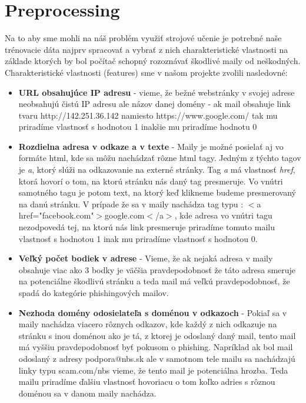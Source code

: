 \documentclass[12pt]{article}
\begin{document}
\section*{Preprocessing}
Na to aby sme mohli na náš problém využiť strojové učenie je potrebné naše trénovacie dáta najprv spracovať a vybrať z nich charakteristické vlastnosti na základe ktorých by bol počítač schopný rozoznávať škodlivé maily od neškodných. Charakteristické vlastnosti (features) sme v našom projekte zvolili nasledovné:
\begin{itemize}
\item \textbf{URL obsahujúce IP adresu} - vieme, že bežné webstránky v svojej adrese neobsahujú čistú IP adresu ale názov danej domény - ak mail obsahuje link tvaru http://142.251.36.142 namiesto https://www.google.com/ tak mu priradíme vlastnosť s hodnotou 1 inakšie mu priradíme hodnotu 0

\item \textbf{Rozdielna adresa v odkaze a v texte} - Maily je možné posielať aj vo formáte html, kde sa môžu nachádzať rôzne html tagy. Jedným z týchto tagov je \textit{a}, ktorý slúži na odkazovanie na externé stránky. Tag \textit{a} má vlastnosť \textit{href}, ktorá hovorí o tom, na ktorú stránku nás daný tag presmeruje. Vo vnútri samotného tagu je potom text, na ktorý keď klikneme budeme presmerovaný na danú stránku. V prípade že sa v maily nachádza tag typu : $<$a href="facebook.com"$>$google.com$<$/a$>$, kde adresa vo vnútri tagu nezodpovedá tej, na ktorú nás link presmeruje priradíme tomuto mailu vlastnosť s hodnotou 1 inak mu priradíme vlastnosť s hodnotou 0.

\item \textbf{Veľký počet bodiek v adrese} - Vieme, že ak nejaká adresa v maily obsahuje viac ako 3 bodky je väčšia pravdepodobnosť že táto adresa smeruje na potenciálne škodlivú stránku a teda mail má veľkú pravdepodobnosť, že spadá do kategórie phishingových mailov.

\item \textbf{Nezhoda domény odosielateľa s doménou v odkazoch} - Pokiaľ sa v maily nachádza viacero rôznych odkazov, kde každý z nich odkazuje na stránku s inou doménou ako je tá, z ktorej je odoslaný daný mail, tento mail má vyššiu pravdepodobnosť byť pokusom o phishing. Napríklad ak bol mail odoslaný z adresy podpora@nbs.sk ale v samotnom tele mailu sa nachádzajú linky typu scam.com/nbs vieme, že tento mail je potenciálna hrozba. Teda mailu priradíme ďalšiu vlastnosť hovoriacu o tom koľko adries s rôznou doménou sa v danom maily nachádza.


\end{itemize}
\end{document}
